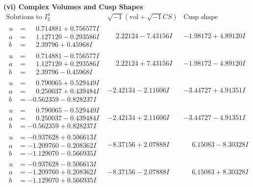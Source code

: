 \documentclass[1p]{elsarticle_modified}
\theoremstyle{definition}
\newcommand{\I}{\sqrt{-1}}
\begin{document}
\newpage\flushleft \textbf{(vi) Complex Volumes and Cusp Shapes}
$$\begin{array}{c|c|c}  
\text{Solutions to }I^u_{2}& \I (\text{vol} + \sqrt{-1}CS) & \text{Cusp shape}\\
 \hline 
\begin{aligned}
u &= \phantom{-}0.714881 + 0.756577 I \\
a &= \phantom{-}1.127120 - 0.293586 I \\
b &= \phantom{-}2.39796 + 0.45968 I\end{aligned}
 & \phantom{-}2.22124 - 7.43156 I & -1.98172 + 4.89120 I \\ \hline\begin{aligned}
u &= \phantom{-}0.714881 - 0.756577 I \\
a &= \phantom{-}1.127120 + 0.293586 I \\
b &= \phantom{-}2.39796 - 0.45968 I\end{aligned}
 & \phantom{-}2.22124 + 7.43156 I & -1.98172 - 4.89120 I \\ \hline\begin{aligned}
u &= \phantom{-}0.790065 + 0.529449 I \\
a &= \phantom{-}0.250037 + 0.439484 I \\
b &= -0.562359 - 0.828237 I\end{aligned}
 & -2.42134 - 2.11606 I & -3.44727 + 4.91351 I \\ \hline\begin{aligned}
u &= \phantom{-}0.790065 - 0.529449 I \\
a &= \phantom{-}0.250037 - 0.439484 I \\
b &= -0.562359 + 0.828237 I\end{aligned}
 & -2.42134 + 2.11606 I & -3.44727 - 4.91351 I \\ \hline\begin{aligned}
u &= -0.937628 + 0.506613 I \\
a &= -1.209760 - 0.208362 I \\
b &= -1.129070 - 0.566935 I\end{aligned}
 & -8.37156 + 2.07888 I & \phantom{-}6.15083 - 8.30328 I \\ \hline\begin{aligned}
u &= -0.937628 - 0.506613 I \\
a &= -1.209760 + 0.208362 I \\
b &= -1.129070 + 0.566935 I\end{aligned}
 & -8.37156 - 2.07888 I & \phantom{-}6.15083 + 8.30328 I \\ \hline\begin{aligned}

\end{aligned}
\end{array}$$
\end{document}
